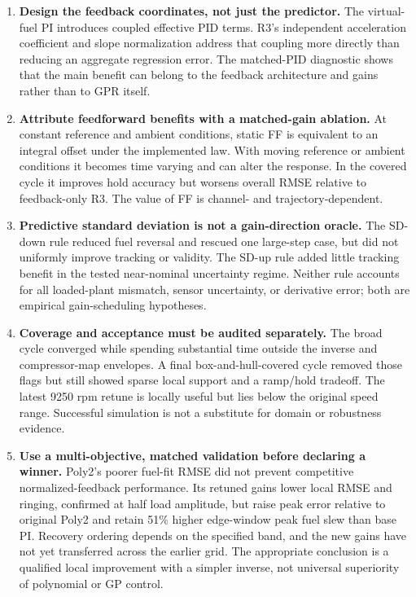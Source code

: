 \begin{enumerate}[label=\textbf{\arabic*.},leftmargin=*]
\item \textbf{Design the feedback coordinates, not just the predictor.} The virtual-fuel PI introduces coupled effective PID terms. R3's independent acceleration coefficient and slope normalization address that coupling more directly than reducing an aggregate regression error. The matched-PID diagnostic shows that the main benefit can belong to the feedback architecture and gains rather than to GPR itself.

\item \textbf{Attribute feedforward benefits with a matched-gain ablation.} At constant reference and ambient conditions, static FF is equivalent to an integral offset under the implemented law. With moving reference or ambient conditions it becomes time varying and can alter the response. In the covered cycle it improves hold accuracy but worsens overall RMSE relative to feedback-only R3. The value of FF is channel- and trajectory-dependent.

\item \textbf{Predictive standard deviation is not a gain-direction oracle.} The SD-down rule reduced fuel reversal and rescued one large-step case, but did not uniformly improve tracking or validity. The SD-up rule added little tracking benefit in the tested near-nominal uncertainty regime. Neither rule accounts for all loaded-plant mismatch, sensor uncertainty, or derivative error; both are empirical gain-scheduling hypotheses.

\item \textbf{Coverage and acceptance must be audited separately.} The broad cycle converged while spending substantial time outside the inverse and compressor-map envelopes. A final box-and-hull-covered cycle removed those flags but still showed sparse local support and a ramp/hold tradeoff. The latest 9250 rpm retune is locally useful but lies below the original speed range. Successful simulation is not a substitute for domain or robustness evidence.

\item \textbf{Use a multi-objective, matched validation before declaring a winner.} Poly2's poorer fuel-fit RMSE did not prevent competitive normalized-feedback performance. Its retuned gains lower local RMSE and ringing, confirmed at half load amplitude, but raise peak error relative to original Poly2 and retain 51\% higher edge-window peak fuel slew than base PI. Recovery ordering depends on the specified band, and the new gains have not yet transferred across the earlier grid. The appropriate conclusion is a qualified local improvement with a simpler inverse, not universal superiority of polynomial or GP control.
\end{enumerate}

